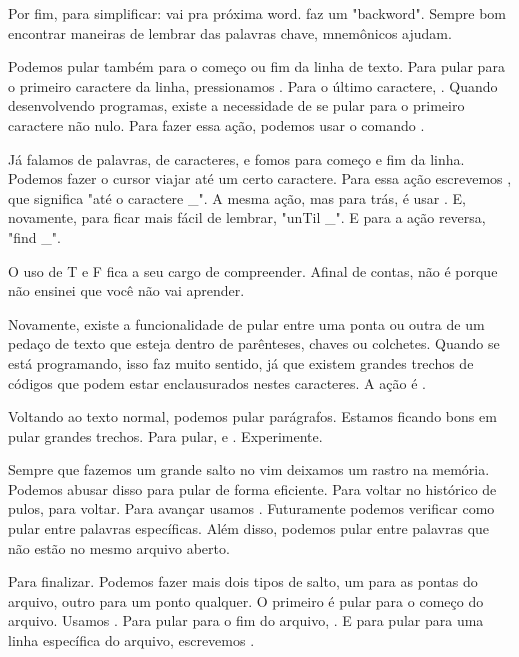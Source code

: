 \documentclass[a4paper, 12pt]{article}
\begin{document}
Por fim, para simplificar:  vai pra próxima word.  faz um "backword".
Sempre bom encontrar maneiras de lembrar das palavras chave, mnemônicos ajudam.


Podemos pular também para o começo ou fim da linha de texto.
Para pular para o primeiro caractere da linha, pressionamos .
Para o último caractere, \vimcommand{\$}.
Quando desenvolvendo programas, existe a necessidade de se pular para o primeiro caractere não nulo.
Para fazer essa ação, podemos usar o comando \vimcommand{\^}.

Já falamos de palavras, de caracteres, e fomos para começo e fim da linha.
Podemos fazer o cursor viajar até um certo caractere.
Para essa ação escrevemos , que significa "até o caractere \_".
A mesma ação, mas para trás, é usar .
E, novamente, para ficar mais fácil de lembrar, "unTil \_".
E para a ação reversa, "find \_".

O uso de T e F fica a seu cargo de compreender.
Afinal de contas, não é porque não ensinei que você não vai aprender.


Novamente, existe a funcionalidade de pular entre uma ponta ou outra de um pedaço de
texto que esteja dentro de parênteses, chaves ou colchetes.
Quando se está programando, isso faz muito sentido, já que existem grandes trechos de
códigos que podem estar enclausurados nestes caracteres.
A ação é \vimcommand{\%}.


Voltando ao texto normal, podemos pular parágrafos.
Estamos ficando bons em pular grandes trechos.
Para pular, \vimcommand{\{} e \vimcommand{\}}. Experimente.


Sempre que fazemos um grande salto no vim deixamos um rastro na memória.
Podemos abusar disso para pular de forma eficiente.
Para voltar no histórico de pulos,  para voltar.
Para avançar usamos .
Futuramente podemos verificar como pular entre palavras específicas.
Além disso, podemos pular entre palavras que não estão no mesmo arquivo aberto.

Para finalizar.
Podemos fazer mais dois tipos de salto, um para as pontas do arquivo, outro para um ponto qualquer.
O primeiro é pular para o começo do arquivo.
Usamos .
Para pular para o fim do arquivo, .
E para pular para uma linha específica do arquivo, escrevemos .
\end{document}
